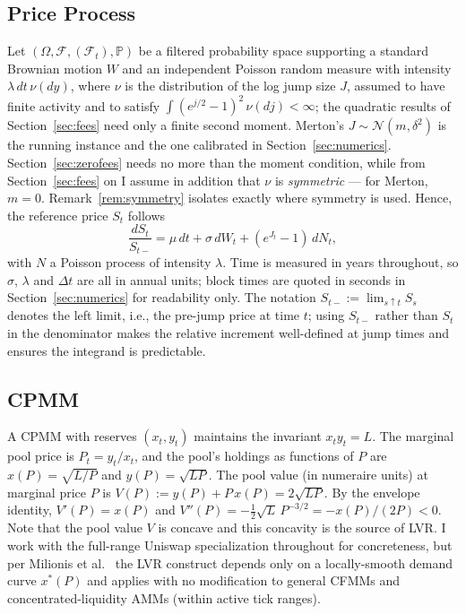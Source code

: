 \documentclass[runningheads]{llncs}
\newcommand{\Prob}{\mathbb{P}}
\newcommand{\dt}{\Delta t}
\newcommand{\1}{\mathbf{1}}
\begin{document}
\subsection{Price Process}
Let $(\Omega, \mathcal{F}, (\mathcal{F}_t), \Prob)$ be a filtered probability space supporting a standard Brownian motion $W$ and an independent Poisson random measure with intensity $\lambda \, dt \, \nu(dy)$, where $\nu$ is the distribution of the log jump size $J$, assumed to have finite activity and to satisfy $\int(e^{j/2}-1)^2\,\nu(dj)<\infty$; the quadratic results of Section~\ref{sec:fees} need only a finite second moment. Merton's $J \sim \mathcal{N}(m,\delta^2)$ is the running instance and the one calibrated in Section~\ref{sec:numerics}. Section~\ref{sec:zerofees} needs no more than the moment condition, while from Section~\ref{sec:fees} on I assume in addition that $\nu$ is \emph{symmetric} --- for Merton, $m=0$. Remark~\ref{rem:symmetry} isolates exactly where symmetry is used. Hence, the reference price $S_t$ follows
\begin{equation}\label{eq:merton}
\frac{dS_t}{S_{t-}} = \mu\,dt + \sigma \, dW_t + (e^{J_t} - 1)\,dN_t,
\end{equation}
with $N$ a Poisson process of intensity $\lambda$. Time is measured in years throughout, so $\sigma$, $\lambda$ and $\dt$ are all in annual units; block times are quoted in seconds in Section~\ref{sec:numerics} for readability only. The notation $S_{t-} := \lim_{s\uparrow t} S_s$ denotes the left limit, i.e., the pre-jump price at time $t$; using $S_{t-}$ rather than $S_t$ in the denominator makes the relative increment well-defined at jump times and ensures the integrand is predictable.

\subsection{CPMM}
A CPMM with reserves $(x_t, y_t)$ maintains the invariant $x_t y_t = L$. The marginal pool price is $P_t = y_t / x_t$, and the pool's holdings as functions of $P$ are $x(P) = \sqrt{L/P}$ and $y(P) = \sqrt{L P}$.
The pool value (in numeraire units) at marginal price $P$ is
$V(P) := y(P) + P\,x(P) = 2\sqrt{LP}$.
By the envelope identity, $V'(P) = x(P)$ and
$V''(P) = -\tfrac{1}{2}\sqrt{L}\,P^{-3/2} = -x(P)/(2P) < 0$.
Note that the pool value $V$ is concave and this concavity is the source of LVR. I work with the full-range Uniswap specialization throughout for concreteness, but per Milionis et al.~\cite[Remark~1]{milionis2022automated} the LVR construct depends only on a locally-smooth demand curve $x^*(P)$ and applies with no modification to general CFMMs and concentrated-liquidity AMMs (within active tick ranges).
\end{document}
